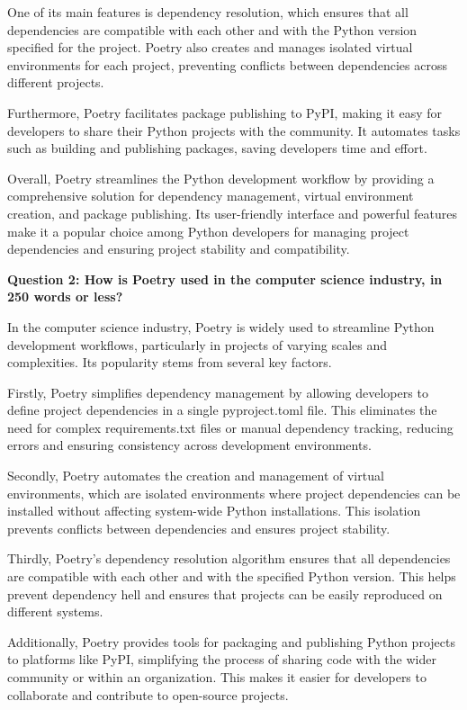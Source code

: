 \documentclass[a4paper, 11pt]{report}
\begin{document}
One of its main features is dependency resolution, which ensures that all dependencies are compatible with each other and with the Python version specified for the project. Poetry also creates and manages isolated virtual environments for each project, preventing conflicts between dependencies across different projects. 

Furthermore, Poetry facilitates package publishing to PyPI, making it easy for developers to share their Python projects with the community. It automates tasks such as building and publishing packages, saving developers time and effort. 

Overall, Poetry streamlines the Python development workflow by providing a comprehensive solution for dependency management, virtual environment creation, and package publishing. Its user-friendly interface and powerful features make it a popular choice among Python developers for managing project dependencies and ensuring project stability and compatibility. 

\textbf{Question 2: How is Poetry used in the computer science industry, in 250 words or less?} 

In the computer science industry, Poetry is widely used to streamline Python development workflows, particularly in projects of varying scales and complexities. Its popularity stems from several key factors. 

Firstly, Poetry simplifies dependency management by allowing developers to define project dependencies in a single pyproject.toml file. This eliminates the need for complex requirements.txt files or manual dependency tracking, reducing errors and ensuring consistency across development environments. 

Secondly, Poetry automates the creation and management of virtual environments, which are isolated environments where project dependencies can be installed without affecting system-wide Python installations. This isolation prevents conflicts between dependencies and ensures project stability. 

Thirdly, Poetry's dependency resolution algorithm ensures that all dependencies are compatible with each other and with the specified Python version. This helps prevent dependency hell and ensures that projects can be easily reproduced on different systems. 

Additionally, Poetry provides tools for packaging and publishing Python projects to platforms like PyPI, simplifying the process of sharing code with the wider community or within an organization. This makes it easier for developers to collaborate and contribute to open-source projects. 
\end{document}
